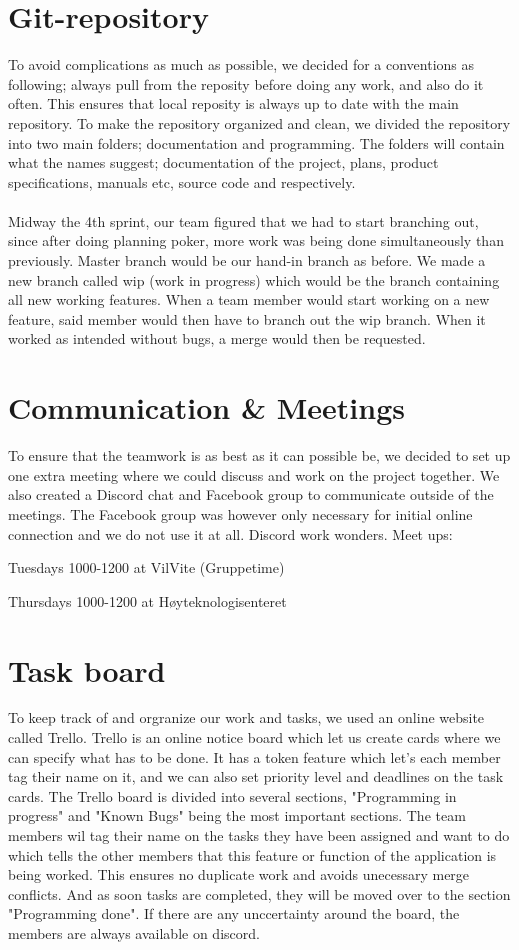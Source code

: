 \documentclass{article}
\begin{document}
\section*{Git-repository}
To avoid complications as much as possible, we decided for a conventions as following; always pull from the reposity before doing any work, and also do it often. This ensures that local reposity is always up to date with the main repository. To make the repository organized and clean, we divided the repository into two main folders; documentation and programming. The folders will contain what the names suggest; documentation of the project, plans, product specifications, manuals etc, source code and respectively.\\\\
Midway the 4th sprint, our team figured that we had to start branching out, since after doing planning poker, more work was being done simultaneously than previously. Master branch would be our hand-in branch as before. We made a new branch called wip (work in progress) which would be the branch containing all new working features. When a team member would start working on a new feature, said member would then have to branch out the wip branch. When it worked as intended without bugs, a merge would then be requested.

\section*{Communication \& Meetings}
To ensure that the teamwork is as best as it can possible be, we decided to set up one extra meeting where we could discuss and work on the project together. We also created a Discord chat and Facebook group to communicate outside of the meetings. The Facebook group was however only necessary for initial online connection and we do not use it at all. Discord work wonders.
Meet ups:
			\begin{list}{-}{}
				\item Tuesdays 1000-1200 at VilVite (Gruppetime) 
				\item Thursdays 1000-1200 at Høyteknologisenteret
			\end{list}

\section*{Task board}
To keep track of and orgranize our work and tasks, we used an online website called Trello. Trello is an online notice board which let us create cards where we can specify what has to be done. It has a token feature which let's each member tag their name on it, and we can also set priority level and deadlines on the task cards. The Trello board is divided into several sections, "Programming in progress" and "Known Bugs" being the most important sections. The team members wil tag their name on the tasks they have been assigned and want to do which tells the other members that this feature or function of the application is being worked. This ensures no duplicate work and avoids unecessary merge conflicts. And as soon tasks are completed, they will be moved over to the section "Programming done". If there are any unccertainty around the board, the members are always available on discord.
\end{document}
